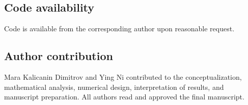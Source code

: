 \documentclass[10pt]{article}
\theoremstyle{plain}
\theoremstyle{definition}
\theoremstyle{remark}
\begin{document}
\subsection*{Code availability}
Code is available from the corresponding author upon reasonable request.

\subsection*{Author contribution}
Mara Kalicanin Dimitrov and Ying Ni contributed to the conceptualization, mathematical analysis, numerical design, interpretation of results, and manuscript preparation. All authors read and approved the final manuscript.


\end{document}
